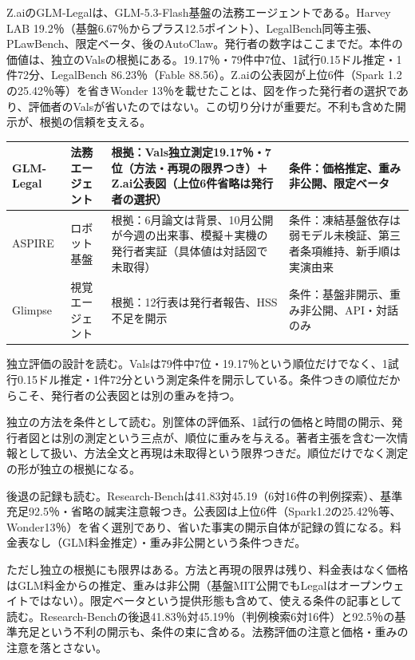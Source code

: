 \documentclass[lualatex,a4paper,10pt]{jlreq}
\begin{document}
Z.aiのGLM-Legalは、GLM-5.3-Flash基盤の法務エージェントである。Harvey LAB 19.2％（基盤6.67％からプラス12.5ポイント）、LegalBench同等主張、PLawBench、限定ベータ、後のAutoClaw。発行者の数字はここまでだ。本件の価値は、独立のValsの根拠にある。19.17％・79件中7位、1試行0.15ドル推定・1件72分、LegalBench 86.23％（Fable 88.56）。Z.aiの公表図が上位6件（Spark 1.2の25.42％等）を省きWonder 13％を載せたことは、図を作った発行者の選択であり、評価者のValsが省いたのではない。この切り分けが重要だ。不利も含めた開示が、根拠の信頼を支える。
\cite{B55,B53,B54}

\begin{strip} %
\centering\footnotesize
{}
\begin{tabularx}{0.96\linewidth}{@{}lXXX@{}}
\toprule
GLM-Legal & 法務エージェント & 根拠：Vals独立測定19.17％・7位（方法・再現の限界つき）＋Z.ai公表図（上位6件省略は発行者の選択） & 条件：価格推定、重み非公開、限定ベータ \cite{B55,B53,B54} \\
\midrule
ASPIRE & ロボット基盤 & 根拠：6月論文は背景、10月公開が今週の出来事、模擬＋実機の発行者実証（具体値は対話図で未取得） & 条件：凍結基盤依存は弱モデル未検証、第三者条項維持、新手順は実演由来 \cite{B57,B56,B89} \\
\midrule
Glimpse & 視覚エージェント & 根拠：12行表は発行者報告、HSS不足を開示 & 条件：基盤非開示、重み非公開、API・対話のみ \cite{B58,B59,B88} \\
\bottomrule
\end{tabularx}
\end{strip} %


独立評価の設計を読む。Valsは79件中7位・19.17％という順位だけでなく、1試行0.15ドル推定・1件72分という測定条件を開示している。条件つきの順位だからこそ、発行者の公表図とは別の重みを持つ。
\cite{B55,B53,B54}


独立の方法を条件として読む。別筐体の評価系、1試行の価格と時間の開示、発行者図とは別の測定という三点が、順位に重みを与える。著者主張を含む一次情報として扱い、方法全文と再現は未取得という限界つきだ。順位だけでなく測定の形が独立の根拠になる。
\cite{B55,B53,B54}


後退の記録も読む。Research-Benchは41.83対45.19（6対16件の判例探索）、基準充足92.5％・省略の誠実注意報つき。公表図は上位6件（Spark1.2の25.42％等、Wonder13％）を省く選別であり、省いた事実の開示自体が記録の質になる。料金表なし（GLM料金推定）・重み非公開という条件つきだ。
\cite{B55,B53,B54}


ただし独立の根拠にも限界はある。方法と再現の限界は残り、料金表はなく価格はGLM料金からの推定、重みは非公開（基盤MIT公開でもLegalはオープンウェイトではない）。限定ベータという提供形態も含めて、使える条件の記事として読む。Research-Benchの後退41.83％対45.19％（判例検索6対16件）と92.5％の基準充足という不利の開示も、条件の束に含める。法務評価の注意と価格・重みの注意を落とさない。
\cite{B55,B53,B54}
\end{document}
